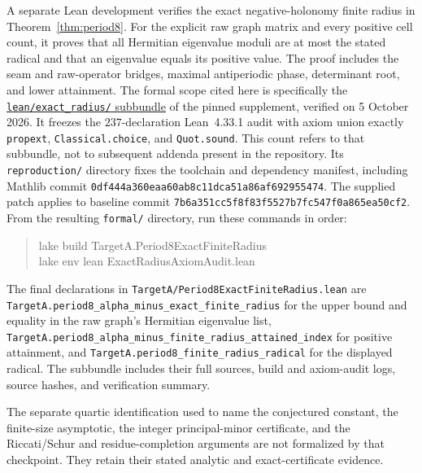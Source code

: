 A separate Lean development verifies the exact negative-holonomy finite
radius in Theorem~\ref{thm:period8}. For the explicit raw graph matrix and
every positive cell count, it proves that all Hermitian eigenvalue moduli
are at most the stated radical and that an eigenvalue equals its positive
value. The proof includes the seam and raw-operator bridges, maximal
antiperiodic phase, determinant root, and lower attainment. The formal scope cited here is specifically the
\href{https://github.com/whzy3185/math/tree/12e3389c07cc5a632023a1f6b972f9baf450a6a0/research/c029_holonomy_schur_20261005/lean/exact_radius}{\texttt{lean/exact\_radius/} subbundle}
of the pinned supplement, verified on 5 October 2026. It freezes the
$237$-declaration Lean~4.33.1 audit with axiom union exactly
\texttt{propext}, \texttt{Classical.choice}, and \texttt{Quot.sound}.
This count refers to that subbundle, not to subsequent addenda present in
the repository. Its \nolinkurl{reproduction/} directory fixes the toolchain
and dependency manifest, including Mathlib commit
\nolinkurl{0df444a360eaa60ab8c11dca51a86af692955474}.
The supplied patch applies to baseline commit
\nolinkurl{7b6a351cc5f8f83f5527b7fc547f0a865ea50cf2}.
From the resulting \nolinkurl{formal/} directory, run these commands in order:
\begin{quote}\small\ttfamily
lake build TargetA.Period8ExactFiniteRadius\\
lake env lean ExactRadiusAxiomAudit.lean
\end{quote}

\begin{samepage}
The final declarations in \nolinkurl{TargetA/Period8ExactFiniteRadius.lean}
are \nolinkurl{TargetA.period8_alpha_minus_exact_finite_radius} for the
upper bound and equality in the raw graph's Hermitian eigenvalue list,
\nolinkurl{TargetA.period8_alpha_minus_finite_radius_attained_index} for
positive attainment, and \nolinkurl{TargetA.period8_finite_radius_radical}
for the displayed radical. The subbundle includes their full sources,
build and axiom-audit logs, source hashes, and verification summary.
\par\end{samepage}

The separate quartic identification used to name the conjectured constant,
the finite-size asymptotic, the integer principal-minor certificate, and
the Riccati/Schur and residue-completion arguments are not formalized by
that checkpoint. They retain their stated analytic and exact-certificate
evidence.

